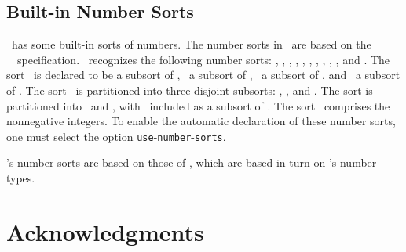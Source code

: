 \subsection{Built-in Number Sorts}
\label{sec:numbers}


\Snark\  has some built-in sorts of numbers.
The number sorts in \snark\  are based on the \ansi\   \kif\
specification. \Snark\  recognizes the following number sorts: \nnumber,
\complex, \real, \rational, \integer, \nnatural, \zero, \positive, \negative,
\odd, and \even.  The sort \nnumber\  is declared to be a subsort of \complex,
\real\   a subsort of \complex, \rational\  a subsort of \real,
and \integer\  a subsort of \rational.  The sort \real\   is partitioned
into three disjoint subsorts: \negative, \zero, and \positive.
The sort \integer  is partitioned into \even\  and \odd, with \zero\  included
as a subsort of \even.  The sort \nnatural\  comprises the
nonnegative integers.  To enable the automatic declaration of these
number sorts, one must select the option {\tt use}-{\tt number}-{\tt sorts}.


\Snark\/'s number sorts are based on those of \kif, which are based in turn
on \commonlisp's number types.





\section*{Acknowledgments}

